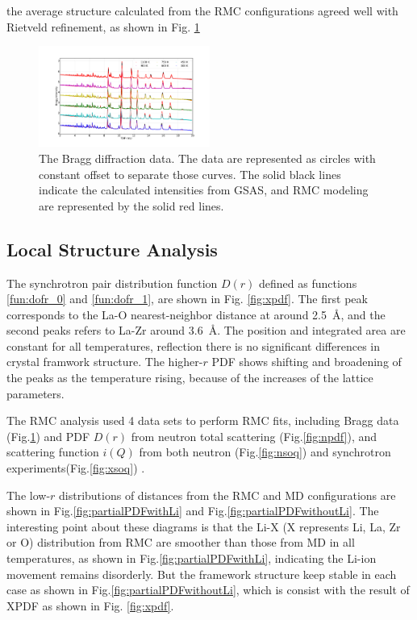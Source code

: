 \documentclass[twoside,twocolumn,9pt]{article}
\begin{document}
the average structure calculated from the RMC configurations agreed well with Rietveld refinement, as shown in Fig. \ref{fig:Rietveld_refinement}



\begin{figure}
\centering
\includegraphics[width=0.5\textwidth]{Pics/bragg.pdf}
\caption{The Bragg diffraction data. The data are represented as circles with constant offset to separate those curves.
The solid black lines indicate the  calculated intensities from GSAS, and RMC modeling are represented by the solid red lines. }
\label{fig:Rietveld_refinement}
\end{figure}

\subsection{Local Structure Analysis}
The synchrotron pair distribution function $D(r)$ defined as functions \ref{fun:dofr_0} and \ref{fun:dofr_1}, are shown in Fig. \ref{fig:xpdf}.
The first peak corresponds to the La-O nearest-neighbor distance at around 2.5~\AA, and the second peaks refers to La-Zr around 3.6~\AA.
The position and integrated area are constant for all temperatures,
reflection there is no significant differences in crystal framwork structure. The higher-$r$ PDF shows shifting and broadening of the peaks as the temperature rising,
because of the increases of the lattice parameters.

 The RMC analysis used 4 data sets to perform RMC fits, including Bragg data (Fig.\ref{fig:Rietveld_refinement}) and PDF $D(r)$ from neutron total scattering (Fig.\ref{fig:npdf}),
 and scattering function $i(Q)$ from both neutron (Fig.\ref{fig:nsoq})  and synchrotron experiments(Fig.\ref{fig:xsoq}) .


The low-$r$  distributions of distances from the RMC and MD configurations are shown in Fig.\ref{fig:partialPDFwithLi} and  Fig.\ref{fig:partialPDFwithoutLi}. The interesting point about these diagrams is that
the Li-X (X represents Li, La, Zr or O) distribution from RMC are smoother than those from MD in all temperatures, as shown in Fig.\ref{fig:partialPDFwithLi}, indicating the Li-ion movement remains  disorderly.
But the framework structure keep stable in each case as shown in Fig.\ref{fig:partialPDFwithoutLi}, which is consist with the result of XPDF as shown in Fig. \ref{fig:xpdf}.
\end{document}
